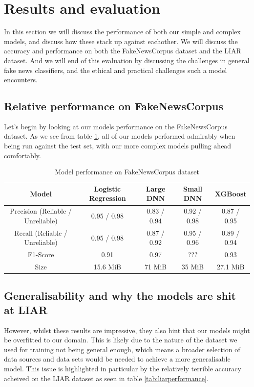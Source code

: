 \section{Results and evaluation}
In this section we will discuss the performance of both our simple and complex models, and discuss how these stack up
against eachother. We will discuss the accuracy and performance on both the FakeNewsCorpus dataset and the LIAR
dataset. And we will end of this evaluation by discussing the challenges in general fake news classifiers, and the
ethical and practical challenges such a model encounters.

\subsection{Relative performance on FakeNewsCorpus}
Let's begin by looking at our models performance on the FakeNewsCorpus dataset. As we see from table \ref{tab:fakenewsperformance},
all of our models performed admirably when being run against the test set, with our more complex models pulling ahead
comfortably.

\begin{table}[htpb]
  \centering
  \caption{Model performance on FakeNewsCorpus dataset}
  \label{tab:fakenewsperformance}

  \begin{tabular}{c|cccc}
    Model & Logistic Regression & Large DNN & Small DNN & XGBoost \\ \hline
    Precision (Reliable / Unreliable) & 0.95 / 0.98 & 0.83 / 0.94 & 0.92 / 0.98 & 0.87 / 0.95 \\ \hline
    Recall (Reliable / Unreliable) & 0.95 / 0.98 & 0.87 / 0.92 & 0.95 / 0.96 & 0.89 / 0.94 \\ \hline
    F1-Score & 0.91 & 0.97 & ??? & 0.93 \\ \hline
    Size & 15.6 MiB & 71 MiB & 35 MiB & 27.1 MiB 
  \end{tabular}
\end{table}

\subsection{Generalisability and why the models are shit at LIAR}
However, whilst these results are impressive, they also hint that our models might be overfitted to our domain. This is
likely due to the nature of the dataset we used for training not being general enough, which means a broader selection
of data sources and data sets would be needed to achieve a more generalisable model. This issue is highlighted in
particular by the relatively terrible accuracy acheived on the LIAR dataset as seen in table \ref{tab:liarperformance}.

